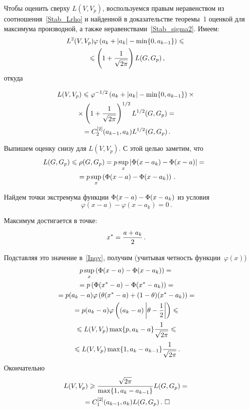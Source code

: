 \begin{multicols}{2}
Чтобы оценить сверху $L(V,V_p)$, воспользуемся правым
неравенством из соотношения~\eqref{Stab_Lrho} и найденной в
доказательстве теоремы~1 оценкой для
максимума производной, а также неравенствами~\eqref{Stab_sigma2}.
Имеем:
\begin{multline*}
L^2(V,V_p)\varphi\left(a_k+|a_k|-\min\{0,a_{k-1}\}\right)\leqslant{}\\
{}\leqslant
\left(1+\displaystyle\frac{\displaystyle 1\mathstrut}{\displaystyle \sqrt{2\pi}\mathstrut}\right)L(G,G_p)\,,
\end{multline*}
%
откуда

\noindent
\begin{multline*}
L(V,V_p)\leqslant\varphi^{-1/2}
\left(a_k+|a_k|-\min\{0,a_{k-1}\}\right)\times{}\\
{}\times
\left(1+\displaystyle\frac{\displaystyle 1\mathstrut}{\displaystyle \sqrt{2\pi}\mathstrut}\right)^{1/2}L^{1/2}(G,G_p)={}\\
{}=C_2^{[2]}(a_{k-1},a_k)L^{1/2}(G,G_p)\,.
\end{multline*}

Выпишем оценку снизу для $L(V,V_p)$. С этой целью заметим, что
\begin{multline}
\label{Inqv}
\hspace*{-5.16743pt}L(G,G_p)\leqslant\rho(G,G_p)=p\sup\limits_x|\Phi(x-a_k)-\Phi(x-a)|
={}\\
{}=p\sup\limits_x\left(\Phi(x-a)-\Phi(x-a_k)\right)\,.
\end{multline}


Найдем точки экстремума функции $\Phi(x-a)\hm-\Phi(x-a_k)$ из условия
$$
\varphi(x-a)-\varphi(x-a_k)=0\,.
$$

Максимум достигается в точке:
$$
x^*=\displaystyle\frac{\displaystyle a+a_k\mathstrut}{\displaystyle 2\mathstrut}\,.
$$

Подставляя это значение в~\eqref{Inqv}, получим (учитывая четность
функции~$\varphi(x)$)
\begin{multline*}
p\sup\limits_x\left(\Phi(x-a)-\Phi(x-a_k)\right)
={}\\
{}=p\left(\Phi(x^*-a)-\Phi(x^*-a_k)\right)={}\\
{}=p(a_k-a)\varphi\left(\theta(x^*-a)+(1-\theta)(x^*-a_k)\right)={}\\
{}= p(a_k-a)\varphi\left((a_k-a)\left\vert\theta-\displaystyle\frac{\displaystyle 1\mathstrut}{\displaystyle 2\mathstrut}\right\vert\right)\leqslant{}\\
{}\leqslant L(V,V_p)\max\{p,a_k-a\}\displaystyle\frac{\displaystyle 1\mathstrut}{\displaystyle \sqrt{2\pi}\mathstrut}
\leqslant{}\\
{}\leqslant L(V,V_p)\max\{1,a_k-a_{k-1}\}\displaystyle\frac{\displaystyle 1\mathstrut}{\displaystyle \sqrt{2\pi}\mathstrut}\,.
\end{multline*}
%
Окончательно
\begin{multline*}
L(V,V_p)\geqslant\displaystyle\frac{\displaystyle \sqrt{2\pi}\mathstrut}{\displaystyle \max\{1,a_k-a_{k-1}\}\mathstrut}L(G,G_p)
={}\\
{}=C_1^{[2]}(a_{k-1},a_k)L(G,G_p)\,.~\square
\end{multline*}


\end{multicols}
